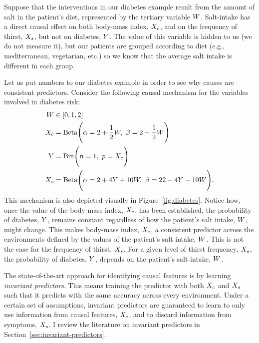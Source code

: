 \documentclass[../thesis.tex]{subfiles}
\begin{document}
Suppose that the interventions in our diabetes example result from the amount of salt in the patient's diet, represented by the tertiary variable $\myrv{w}$. Salt-intake has a direct causal effect on both body-mass index, $\myrv{x}_{c}$, and on the frequency of thirst, $\myrv{x}_{s}$, but not on diabetes, $\myrv{y}$. The value of this variable is hidden to us (we do not measure it), but our patients are grouped according to diet (e.g., mediterranean, vegetarian, etc.) so we know that the average salt intake is different in each group.

Let us put numbers to our diabetes example in order to see why causes are consistent predictors. Consider the following causal mechanism for the variables involved in diabetes risk:
\begin{equation}\label{eq:diabetes-case-study}
\begin{split}
    \myrv{w} &\in \left[ 0,1,2 \right] \\
    \myrv{x}_{c} &= \mathrm{Beta} \Biggl( \alpha = 2 + \frac{1}{2}  \myrv{w}, ~ \beta = 2 - \frac{1}{2}  \myrv{w} \Biggr) \\
    \myrv{y} &= \mathrm{Bin} \Biggl( n = 1, ~ p = \myrv{x}_{c} \Biggr) \\
    \myrv{x}_{s} &= \mathrm{Beta} \Biggl( \alpha = 2 + 4  \myrv{y} + 10  \myrv{w}, ~ \beta = 22 - 4  \myrv{y} - 10  \myrv{w} \Biggr).
\end{split}
\end{equation}
This mechanism is also depicted visually in Figure~\ref{fig:diabetes}. Notice how, once the value of the body-mass index, $\myrv{x}_{c}$, has been established, the probability of diabetes, $\myrv{y}$, remains constant regardless of how the patient's salt intake, $\myrv{w}$, might change. This makes body-mass index, $\myrv{x}_{c}$, a consistent predictor across the environments defined by the values of the patient's salt intake, $\myrv{w}$. This is not the case for the frequency of thirst, $\myrv{x}_{s}$. For a given level of thirst frequency, $\myrv{x}_{s}$, the probability of diabetes, $\myrv{y}$, depends on the patient's salt intake, $\myrv{w}$.

The state-of-the-art approach for identifying causal features is by learning \textit{invariant predictors}. This means training the predictor with both $\myrv{x}_{c}$ and $\myrv{x}_{s}$ such that it predicts with the same accuracy across every environment. Under a certain set of assumptions, invariant predictors are guaranteed to learn to only use information from causal features, $\myrv{x}_{c}$, and to discard information from symptoms, $\myrv{x}_{s}$. I review the literature on invariant predictors in Section~\ref{sec:invariant-predictors}.
\end{document}
